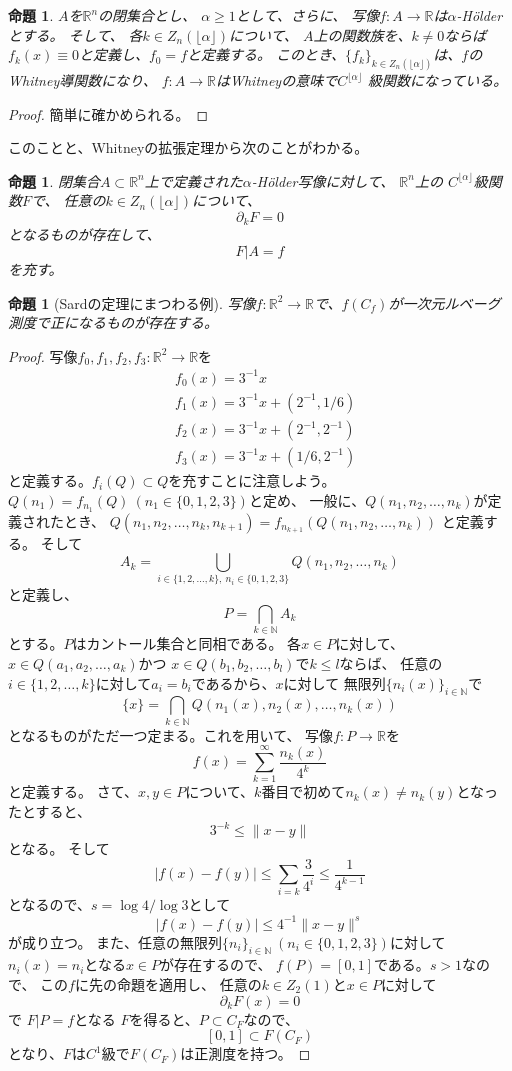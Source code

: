 \documentclass[leqno]{jsarticle}
\newtheorem{prop}[thm]{命題}
\newcommand{\nn}{\mathbb{N}}
\newcommand{\rr}{\mathbb{R}}
\begin{document}
\begin{prop}
$A$を$\rr^n$の閉集合とし、
$\alpha\ge 1$として、さらに、
写像$f:A\to \rr$は$\alpha$-H\"olderとする。
そして、
 各$k\in Z_n(\lfloor \alpha \rfloor)$について、
 $A$上の関数族を、$k\neq 0$ならば$f_k(x)\equiv 0$と定義し、$f_0=f$と定義する。
このとき、$\{f_k\}_{k\in Z_n(\lfloor \alpha \rfloor)}$は、$f$のWhitney導関数になり、
$f:A\to \rr$はWhitneyの意味で$C^{\lfloor\alpha \rfloor}$ 級関数になっている。

\end{prop}
\begin{proof}
簡単に確かめられる。
\end{proof}
このことと、Whitneyの拡張定理から次のことがわかる。
\begin{prop}
閉集合$A\subset \rr^n$上で定義された$\alpha$-H\"older写像に対して、
$\rr^n$上の $C^{\lfloor \alpha \rfloor}$級関数$F$で、
任意の$k\in Z_n(\lfloor \alpha \rfloor)$について、
\[
\partial_kF=0
\]
となるものが存在して、
\[
F|A=f
\]
を充す。
\end{prop}
\begin{prop}[Sardの定理にまつわる例]
写像$f:\rr^2\to \rr$で、$f(C_f)$が一次元ルベーグ測度で正になるものが存在する。
\end{prop}
\begin{proof}
写像$f_0,f_1,f_2,f_3:\rr^2\to \rr$を
\begin{align*}
&f_0(x)=3^{-1}x\\
&f_1(x)=3^{-1}x+(2^{-1}, 1/6)\\
&f_2(x)=3^{-1}x+(2^{-1}, 2^{-1})\\
&f_3(x)=3^{-1}x+(1/6, 2^{-1})
\end{align*}
と定義する。$f_i(Q)\subset Q$を充すことに注意しよう。
$Q(n_1)=f_{n_1}(Q)\ (n_1\in \{0,1,2,3\})$と定め、
一般に、$Q(n_1, n_2,\dots, n_{k})$が定義されたとき、
$Q(n_1, n_2,\dots, n_k,n_{k+1})=f_{n_{k+1}}(Q(n_1, n_2,\dots, n_k))$
と定義する。
そして
\[
A_k=\bigcup_{i\in \{1,2,\dots, k\},\ n_i\in \{0,1,2,3\}}Q(n_1, n_2,\dots, n_k)
\]
と定義し、
\[
P=\bigcap_{k\in \nn} A_k
\]
とする。$P$はカントール集合と同相である。
各$x\in P$に対して、$x\in Q(a_1, a_2,\dots, a_k)$かつ
$x\in Q(b_1, b_2,\dots, b_l)$で$k\le l$ならば、
任意の$i\in \{1,2,\dots, k\}$に対して$a_i=b_i$であるから、$x$に対して
無限列$\{n_i(x)\}_{i\in \nn}$で
\[
\{x\}=\bigcap_{k\in \nn}Q(n_1(x), n_2(x),\dots, n_k(x))
\]
となるものがただ一つ定まる。これを用いて、
写像$f:P\to \rr$を
\[
f(x)=\sum_{k=1}^{\infty}\frac{n_k(x)}{4^k}
\]
と定義する。
さて、$x,y\in P$について、$k$番目で初めて$n_k(x)\neq n_k(y)$となったとすると、
\[
3^{-k}\le \|x-y\|
\]
となる。
そして
\[
|f(x)-f(y)|\le \sum_{i=k}\frac{3}{4^i}\le \frac{1}{4^{k-1}}
\]
となるので、$s=\log 4/\log 3$として
\[
|f(x)-f(y)|\le 4^{-1} \|x-y\|^{s}
\]
が成り立つ。
また、任意の無限列$\{n_i\}_{i\in \nn}\ (n_i\in \{0,1,2,3\})$に対して
$n_i(x)=n_i$となる$x\in P$が存在するので、
$f(P)=[0,1]$である。$s>1$なので、
この$f$に先の命題を適用し、
任意の$k\in Z_2(1)$と$x\in P$に対して
\[
\partial_kF(x)=0
\]
で
$F|P=f$となる
$F$を得ると、$P\subset C_F$なので、
\[
[0,1]\subset F(C_F)
\]
となり、$F$は$C^1$級で$F(C_F)$は正測度を持つ。
\end{proof}
\end{document}
